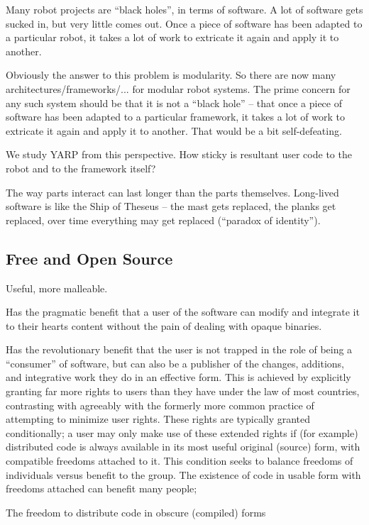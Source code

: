 Many robot projects are ``black holes'', in terms of software.  A lot
of software gets sucked in, but very little comes out.  Once a piece
of software has been adapted to a particular robot, it takes a lot
of work to extricate it again and apply it to another.

Obviously the answer to this problem is modularity.  So there are 
now many architectures/frameworks/... for modular robot systems.
The prime concern for any such system should be that it is not
a ``black hole'' -- that once a piece of software has been adapted
to a particular framework, it takes a lot of work to extricate it
again and apply it to another.  That would be a bit self-defeating.

We study YARP from this perspective.  How sticky is resultant user
code to the robot and to the framework itself?


The way parts interact can last longer than the parts themselves.
Long-lived software is like the Ship of Theseus -- the mast gets replaced,
the planks get replaced, over time everything may get replaced (``paradox
of identity'').


\subsection{Free and Open Source}

Useful, more malleable.

Has the pragmatic benefit that a user of the software can
modify and integrate it to their hearts content without the 
pain of dealing with opaque binaries.

Has the revolutionary benefit that the user is not trapped in the role
of being a ``consumer'' of software, but can also be a publisher of
the changes, additions, and integrative work they do in an effective
form.  This is achieved by explicitly granting far more rights to
users than they have under the law of most countries, contrasting with
agreeably with the formerly more common practice of attempting to
minimize user rights.  These rights are typically granted
conditionally; a user may only make use of these extended rights if
(for example) distributed code is always available in its most useful
original (source) form, with compatible freedoms attached to it.  This
condition seeks to balance freedoms of individuals versus benefit to
the group.  The existence of code in usable form with freedoms 
attached can benefit many people;

The freedom to distribute code in obscure (compiled) forms



